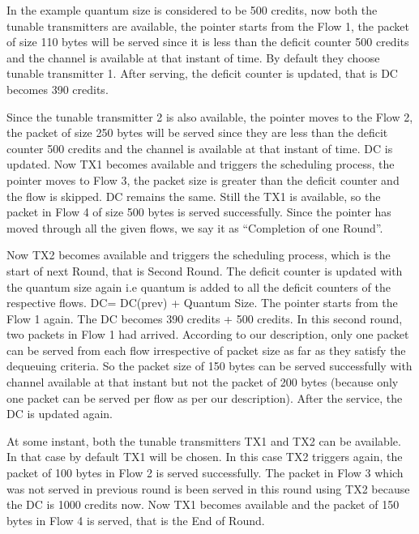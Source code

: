 \documentclass[conference,letterpaper]{IEEEtran}
\begin{document}
In the example quantum size is considered to be 500 credits, now both the
tunable transmitters are available, the pointer starts from the Flow 1, the
packet of size 110 bytes will be served since it is less than the deficit
counter 500 credits and the channel is available at that instant of time. By
default they choose tunable transmitter 1. After serving, the deficit counter is
updated, that is DC becomes 390 credits.

Since the tunable transmitter 2 is also available, the pointer moves to the Flow
2, the packet of size 250 bytes will be served since they are less than the
deficit counter 500 credits and the channel is available at that instant of
time. DC is updated. Now TX1 becomes available and triggers the scheduling
process, the pointer moves to Flow 3, the packet size is greater than the
deficit counter and the flow is skipped. DC remains the same. Still the TX1 is
available, so the packet in Flow 4 of size 500 bytes is served
successfully. Since the pointer has moved through all the given flows, we say it
as ``Completion of one Round''.

Now TX2 becomes available and triggers the scheduling process, which is the
start of next Round, that is Second Round. The deficit counter is updated with
the quantum size again i.e quantum is added to all the deficit counters of the
respective flows. DC= DC(prev) + Quantum Size. The pointer starts from the Flow
1 again. The DC becomes 390 credits + 500 credits. In this second round, two
packets in Flow 1 had arrived. According to our description, only one packet can
be served from each flow irrespective of packet size as far as they satisfy the
dequeuing criteria. So the packet size of 150 bytes can be served successfully
with channel available at that instant but not the packet of 200 bytes (because
only one packet can be served per flow as per our description). After the
service, the DC is updated again.

At some instant, both the tunable transmitters TX1 and TX2 can be available. In
that case by default TX1 will be chosen. In this case TX2 triggers again, the
packet of 100 bytes in Flow 2 is served successfully. The packet in Flow 3 which
was not served in previous round is been served in this round using TX2 because
the DC is 1000 credits now. Now TX1 becomes available and the packet of 150
bytes in Flow 4 is served, that is the End of Round.
\end{document}
